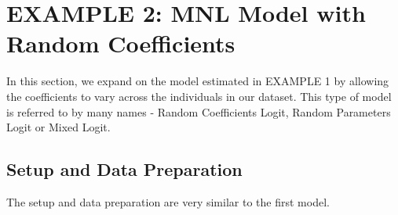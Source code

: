 \documentclass{article}\usepackage{graphicx, color}
\begin{document}
\section*{EXAMPLE 2: MNL Model with Random Coefficients}

In this section, we expand on the model estimated in EXAMPLE 1 by allowing the coefficients to vary across the individuals in our dataset. This type of model is referred to by many names - Random Coefficients Logit, Random Parameters Logit or Mixed Logit. 

\subsection*{Setup and Data Preparation}

The setup and data preparation are very similar to the first model.
\end{document}
